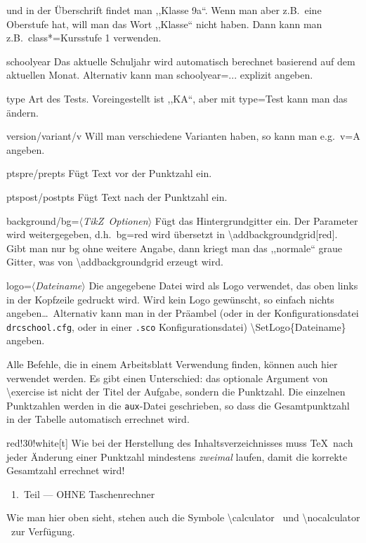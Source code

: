\documentclass[hyperworksheet]{drcschool}
\newcommand*{\cs}[1]{\textup{\ttfamily\textbackslash#1}}                   %
\newcommand*{\opt}[1]{\textup{\ttfamily#1}}                                %
\newcommand*{\param}[1]{\mbox{\normalfont$\langle$\textit{#1}$\rangle$}}   %
\newcommand*{\TikZ}{\textup{Ti\textit{k}Z}}                                %
\begin{document}
\begin{test}[2,M,class=9a,date=32.\ Oktober 2022,v=A,ptspre=>,ptspost=<,logo=example-image]
\begin{compactdesc}
   und in der Überschrift findet man ,,Klasse 9a``. Wenn man aber z.B.~eine Oberstufe
   hat, will man das Wort ,,Klasse`` nicht haben. Dann kann man z.B.~\opt{class*=Kursstufe 1}
   verwenden.
\item[\ttfamily schoolyear] Das aktuelle Schuljahr wird automatisch berechnet basierend
   auf dem aktuellen Monat. Alternativ kann man \opt{schoolyear=...} explizit angeben.
\item[\ttfamily type] Art des Tests. Voreingestellt ist ,,KA``, aber mit \opt{type=Test} kann man das ändern.
\item[\ttfamily version/variant/v] Will man verschiedene Varianten haben, so kann man
   e.g.~\opt{v=A} angeben.
\item[\ttfamily ptspre/prepts] Fügt Text vor der Punktzahl ein.
\item[\ttfamily ptspost/postpts] Fügt Text nach der Punktzahl ein.
\item[\ttfamily background/bg=\param{\TikZ\ Optionen}] Fügt das Hintergrundgitter ein. Der Parameter wird weitergegeben, d.h.\
   \opt{bg=red} wird übersetzt in \cs{addbackgroundgrid[red]}. Gibt man nur \opt{bg}
   ohne weitere Angabe, dann kriegt man das ,,normale`` graue Gitter, was von
   \cs{addbackgroundgrid} erzeugt wird.
\item[\ttfamily logo=\param{Dateiname}] Die angegebene Datei wird
   als Logo verwendet, das oben links in der Kopfzeile gedruckt wird. Wird kein Logo
   gewünscht, so einfach nichts angeben\ldots\ Alternativ kann man in der Präambel
   (oder in der Konfigurationsdatei \texttt{drcschool.cfg}, oder in einer
   \texttt{.sco} Konfigurationsdatei) \cs{SetLogo\{Dateiname\}} angeben.
\end{compactdesc}

Alle Befehle, die in einem Arbeitsblatt Verwendung finden, können auch hier
verwendet werden. Es gibt einen Unterschied: das optionale Argument von \cs{exercise}
ist nicht der Titel der Aufgabe, sondern die Punktzahl. Die einzelnen Punktzahlen
werden in die \texttt{aux}-Datei geschrieben, so dass die Gesamtpunktzahl in
der Tabelle automatisch errechnet wird.

\noindent
\begin{colorminipage}{red!30!white}[t]{\linewidth}
Wie bei der Herstellung des Inhaltsverzeichnisses muss \TeX\ nach jeder Änderung
einer Punktzahl mindestens \emph{zweimal} laufen, damit die korrekte Gesamtzahl
errechnet wird!
\end{colorminipage}

\begin{center}
\nocalculator\ 1.\ Teil --- OHNE Taschenrechner
\end{center}
Wie man hier oben sieht, stehen auch die Symbole \cs{calculator} \calculator\
und \cs{nocalculator} \nocalculator\ zur Verfügung.


\end{test}
\end{document}
